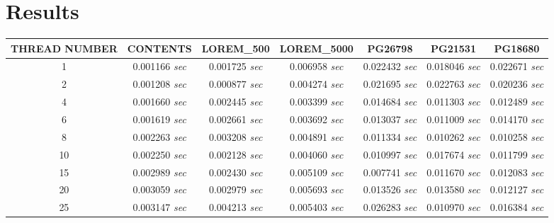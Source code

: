 \vspace{-1mm}
\section{Results}

\begin{sidewaystable}[h]
\centering

\begin{tabular}{|c|c|c|c|c|c|c|}

\hline \rule[-2ex]{0pt}{4.5ex} {\small \textbf{THREAD NUMBER}} & {\small \textbf{CONTENTS}} & {\small \textbf{LOREM\_500}} & {\small \textbf{LOREM\_5000}} & {\small \textbf{PG26798}} & {\small \textbf{PG21531}} & {\small \textbf{PG18680}}  \\ 
\hline 
\hline \rule[-2ex]{0pt}{4.5ex} 1 & 0.001166 \textit{sec} & 0.001725 \textit{sec} & 0.006958 \textit{sec} & 0.022432 \textit{sec} & 0.018046 \textit{sec} & 0.022671 \textit{sec} \\
\hline \rule[-2ex]{0pt}{4.5ex} 2 & 0.001208 \textit{sec} & 0.000877 \textit{sec} & 0.004274 \textit{sec} & 0.021695 \textit{sec} & 0.022763 \textit{sec} & 0.020236 \textit{sec} \\ 
\hline \rule[-2ex]{0pt}{4.5ex} 4 & 0.001660 \textit{sec} & 0.002445 \textit{sec} & 0.003399 \textit{sec} & 0.014684 \textit{sec} & 0.011303 \textit{sec} & 0.012489 \textit{sec} \\ 
\hline \rule[-2ex]{0pt}{4.5ex} 6 & 0.001619 \textit{sec} & 0.002661 \textit{sec} & 0.003692 \textit{sec} & 0.013037 \textit{sec} & 0.011009 \textit{sec} & 0.014170 \textit{sec} \\ 
\hline \rule[-2ex]{0pt}{4.5ex} 8 & 0.002263 \textit{sec} & 0.003208 \textit{sec} & 0.004891 \textit{sec} & 0.011334 \textit{sec} & 0.010262 \textit{sec} & 0.010258 \textit{sec} \\ 
\hline \rule[-2ex]{0pt}{4.5ex} 10 & 0.002250 \textit{sec}& 0.002128 \textit{sec} & 0.004060 \textit{sec} & 0.010997 \textit{sec} & 0.017674 \textit{sec} & 0.011799 \textit{sec} \\ 
\hline \rule[-2ex]{0pt}{4.5ex} 15 & 0.002989 \textit{sec}& 0.002430 \textit{sec} & 0.005109 \textit{sec} & 0.007741 \textit{sec} & 0.011670 \textit{sec} & 0.012083 \textit{sec} \\ 
\hline \rule[-2ex]{0pt}{4.5ex} 20 & 0.003059 \textit{sec}& 0.002979 \textit{sec} & 0.005693 \textit{sec} & 0.013526 \textit{sec} & 0.013580 \textit{sec} & 0.012127 \textit{sec} \\ 
\hline \rule[-2ex]{0pt}{4.5ex} 25 & 0.003147 \textit{sec}& 0.004213 \textit{sec} & 0.005403 \textit{sec} & 0.026283 \textit{sec} & 0.010970 \textit{sec} & 0.016384 \textit{sec} \\ 

\end{tabular}
\end{sidewaystable}
